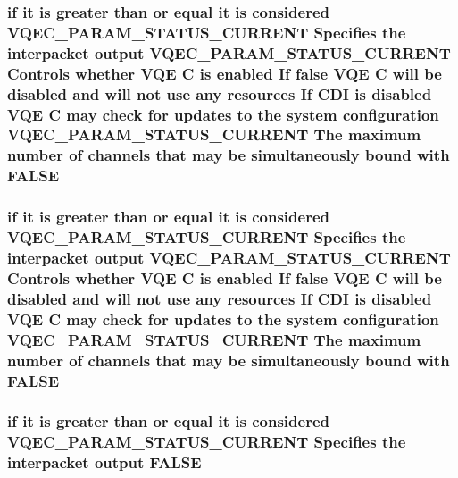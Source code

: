 \subsubsection{\setlength{\rightskip}{0pt plus 5cm}if it is greater than or equal it is considered VQEC\_\-PARAM\_\-STATUS\_\-CURRENT Specifies the interpacket output VQEC\_\-PARAM\_\-STATUS\_\-CURRENT Controls whether VQE \bf{C} is enabled If false VQE \bf{C} will be disabled and will not use any resources If CDI is disabled VQE \bf{C} may check for updates \bf{to} the system configuration VQEC\_\-PARAM\_\-STATUS\_\-CURRENT The maximum number of \bf{channels} that may be simultaneously bound with \bf{FALSE}}\label{vqec__cfg__settings_8h_344788433766858e3cf63c6834eb8de8}


\subsubsection{\setlength{\rightskip}{0pt plus 5cm}if it is greater than or equal it is considered VQEC\_\-PARAM\_\-STATUS\_\-CURRENT Specifies the interpacket output VQEC\_\-PARAM\_\-STATUS\_\-CURRENT Controls whether VQE \bf{C} is enabled If false VQE \bf{C} will be disabled and will not use any resources If CDI is disabled VQE \bf{C} may check for updates \bf{to} the system configuration VQEC\_\-PARAM\_\-STATUS\_\-CURRENT The maximum number of \bf{channels} that may be simultaneously bound with \bf{FALSE}}\label{vqec__cfg__settings_8h_344788433766858e3cf63c6834eb8de8}


\subsubsection{\setlength{\rightskip}{0pt plus 5cm}if it is greater than or equal it is considered VQEC\_\-PARAM\_\-STATUS\_\-CURRENT Specifies the interpacket output \bf{FALSE}}\label{vqec__cfg__settings_8h_1937ccbfc5d9a0f8334871632b12f706}


